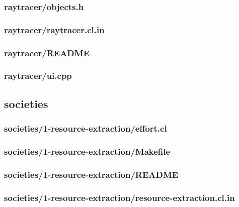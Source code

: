 \documentclass{article}
\begin{document}
\subsubsection*{raytracer/objects.h}


\subsubsection*{raytracer/raytracer.cl.in}


\subsubsection*{raytracer/README}


\subsubsection*{raytracer/ui.cpp}


\subsection*{societies}
\subsubsection*{societies/1-resource-extraction/effort.cl}


\subsubsection*{societies/1-resource-extraction/Makefile}


\subsubsection*{societies/1-resource-extraction/README}


\subsubsection*{societies/1-resource-extraction/resource-extraction.cl.in}

\end{document}
